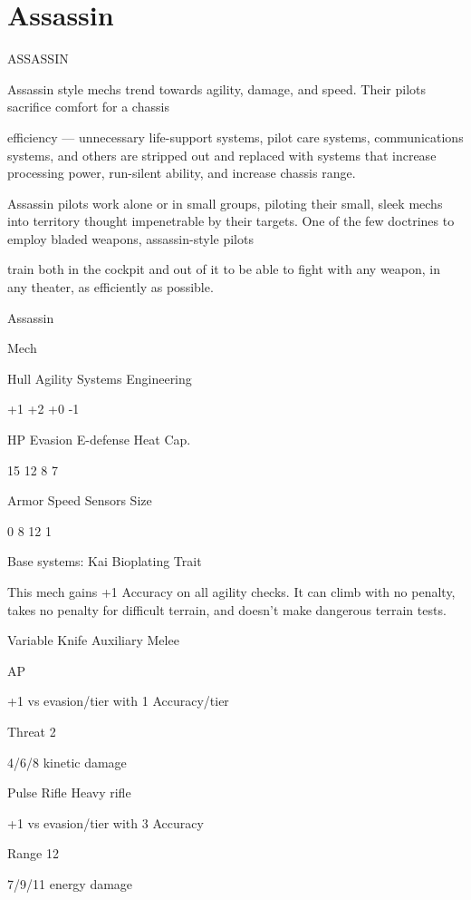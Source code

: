 \section{Assassin}

                                                 ASSASSIN

Assassin style mechs trend towards agility, damage, and speed. Their pilots sacrifice comfort for a chassis

efficiency — unnecessary life-support systems, pilot care systems, communications systems, and others
are stripped out and replaced with systems that increase processing power, run-silent ability, and increase
chassis range.

Assassin pilots work alone or in small groups, piloting their small, sleek mechs into territory thought
impenetrable by their targets. One of the few doctrines to employ bladed weapons, assassin-style pilots

train both in the cockpit and out of it to be able to fight with any weapon, in any theater, as efficiently as
possible.

 Assassin

 Mech

 Hull        Agility      Systems        Engineering

 +1          +2           +0             -1

 HP          Evasion      E-defense      Heat Cap.

  15         12           8              7

 Armor       Speed        Sensors       Size

 0           8            12             1

Base systems:
Kai Bioplating
Trait

This mech gains +1 Accuracy on all agility checks. It can climb with no penalty, takes no penalty
for difficult terrain, and doesn’t make dangerous terrain tests.


Variable Knife
Auxiliary Melee

AP

+1 vs evasion/tier with 1 Accuracy/tier

Threat 2

4/6/8 kinetic damage


Pulse Rifle
Heavy rifle

+1 vs evasion/tier with 3 Accuracy

Range 12

7/9/11 energy damage





